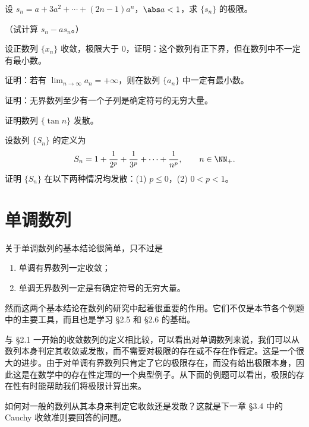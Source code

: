 \begin{xexercise}[4]
设 $s_n=a+3a^2+\cdots+(2n-1)a^n$，$\abs a<1$，求 $\{s_n\}$ 的极限。

  （试计算 $s_n-as_n$。）
\end{xexercise}

\begin{xexercise}[5]
设正数列 $\{x_n\}$ 收敛，极限大于 0，证明：这个数列有正下界，但在数列中不一定有最小数。
\end{xexercise}

\begin{xexercise}[6]
证明：若有 $\displaystyle\lim_{n\to\infty}a_n=+\infty$，则在数列 $\{a_n\}$ 中一定有最小数。
\end{xexercise}

\begin{xexercise}[7]
证明：无界数列至少有一个子列是确定符号的无穷大量。
\end{xexercise}

\begin{xexercise}[8]
证明数列 $\{\tan n\}$ 发散。
\end{xexercise}

\begin{xexercise}[9]
设数列 $\{S_n\}$ 的定义为
  \[
    S_n=1+\frac1{2^p}+\frac1{3^p}+\cdots+\frac1{n^p},\qquad n\in\NN_+.
  \]
  证明 $\{S_n\}$ 在以下两种情况均发散：(1) $p\le0$，(2) $0<p<1$。
\end{xexercise}

\section{单调数列}

关于单调数列的基本结论很简单，只不过是
\begin{enumerate}[label=(\arabic*)]
  \item 单调有界数列一定收敛；
  \item 单调无界数列一定是有确定符号的无穷大量。
\end{enumerate}
然而这两个基本结论在数列的研究中起着很重要的作用。它们不仅是本节各个例题中的主要工具，而且也是学习 §2.5 和 §2.6 的基础。

与 §2.1 一开始的收敛数列的定义相比较，可以看出对单调数列来说，我们可以从数列本身判定其收敛或发散，而不需要对极限的存在或不存在作假定。这是一个很大的进步。由于对单调有界数列只肯定了它的极限存在，而没有给出极限本身，因此这是在数学中的存在性定理的一个典型例子。从下面的例题可以看出，极限的存在性有时能帮助我们将极限计算出来。

如何对一般的数列从其本身来判定它收敛还是发散？这就是下一章 §3.4 中的 Cauchy 收敛准则要回答的问题。

